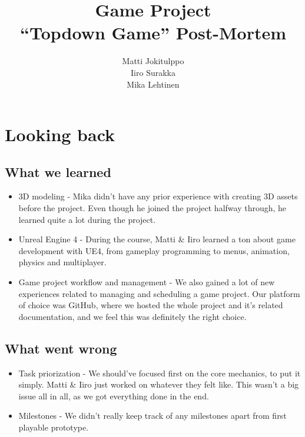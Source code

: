 \documentclass[
  oneside,
  11pt, a4paper,
  footinclude=true,
  headinclude=true,
  cleardoublepage=empty
]{scrbook}
\title{Game Project \\ ``Topdown Game'' Post-Mortem}
\author{Matti Jokitulppo \\ Iiro Surakka \\ Mika Lehtinen}
\begin{document}
\maketitle



\chapter{Looking back}
\section{What we learned}
\begin{itemize}
\item 3D modeling - Mika didn't have any prior experience with creating 3D assets before the project. Even though he joined the project halfway through, he learned quite a lot during the project.
\item Unreal Engine 4 - During the course, Matti \& Iiro learned a ton about game development with UE4, from gameplay programming to menus, animation, physics and multiplayer.
\item Game project workflow and management - We also gained a lot of new experiences related to managing and scheduling a game project. Our platform of choice was GitHub, where we hosted the whole project and it's related documentation, and we feel this was definitely the right choice.
\end{itemize}

\section{What went wrong}
\begin{itemize}
\item Task priorization - We should've focused first on the core mechanics, to put it simply. Matti \& Iiro just worked on whatever they felt like. This wasn't a big issue all in all, as we got everything done in the end.
\item Milestones - We didn't really keep track of any milestones apart from first playable prototype.

\end{itemize}
\end{document}
